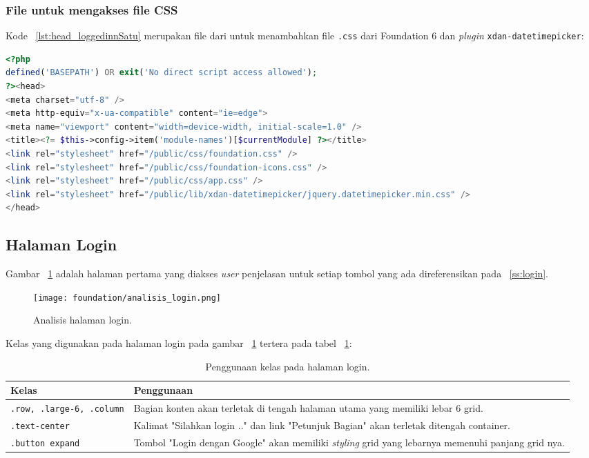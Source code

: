 \subsubsection{File untuk mengakses file CSS}
\noindent Kode ~\ref{lst:head_loggedinnSatu} merupakan file dari   untuk menambahkan file \texttt{.css} dari Foundation 6 dan \textit{plugin} \texttt{xdan-datetimepicker}:
\begin{lstlisting}[language=PHP, caption=Penambahan library css, basicstyle=\footnotesize\ttfamily, frame=single,
columns=fullflexible, keepspaces=true, breaklines=true, showstringspaces=false, label={lst:head_loggedinnSatu}]
<?php
defined('BASEPATH') OR exit('No direct script access allowed');
?><head>
<meta charset="utf-8" />
<meta http-equiv="x-ua-compatible" content="ie=edge">
<meta name="viewport" content="width=device-width, initial-scale=1.0" />
<title><?= $this->config->item('module-names')[$currentModule] ?></title>
<link rel="stylesheet" href="/public/css/foundation.css" />
<link rel="stylesheet" href="/public/css/foundation-icons.css" />
<link rel="stylesheet" href="/public/css/app.css" />
<link rel="stylesheet" href="/public/lib/xdan-datetimepicker/jquery.datetimepicker.min.css" />
</head>
\end{lstlisting}

\subsection{Halaman Login}

\noindent Gambar ~\ref{fig:analisisLogin} adalah halaman pertama yang diakses \textit{user} penjelasan untuk setiap tombol yang ada direferensikan pada ~\ref{ss:login}.

\begin{figure} [H]
	\centering  
	\texttt{[image: foundation/analisis\_login.png]} 
	\caption{Analisis halaman login.} 
	\label{fig:analisisLogin}
\end{figure} 

Kelas yang digunakan pada halaman login pada gambar ~\ref{fig:analisisLogin} tertera pada tabel ~\ref{table:analisisLogin}:\\

\begin{table}[H]
	\centering
	\caption{Penggunaan kelas pada halaman login.}
	\begin{tabularx}{\textwidth}{lX}
		\toprule
		Kelas     & Penggunaan \\
		\midrule
		\texttt{.row, .large-6, .column} & Bagian konten akan terletak di tengah halaman utama yang memiliki lebar 6 grid.  \\
 		\texttt{.text-center} & Kalimat "Silahkan login .." dan link "Petunjuk Bagian" akan terletak ditengah container.\\
		\texttt{.button expand} & Tombol "Login dengan Google" akan memiliki \textit{styling} grid yang lebarnya memenuhi panjang grid nya.\\
		\bottomrule
	\end{tabularx}%
	\label{table:analisisLogin}
\end{table} \noindent \\

